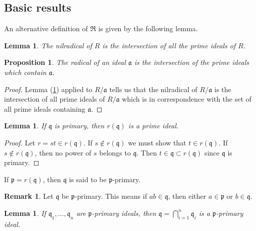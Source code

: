 \documentclass[	DIV=calc,paper=a4,fontsize=11pt]{scrartcl}	 					%
\newtheorem{lem}[thm]{Lemma}
\newtheorem{prop}[thm]{Proposition}
\theoremstyle{definition}
\newtheorem{rem}[thm]{Remark}
\theoremstyle{plain}
\theoremstyle{remark}
\begin{document}
\subsection{Basic results}

An alternative definition of $\mathfrak{R}$ is given by the following lemma.
\begin{lem}\label{nil}
The nilradical of $R$ is the intersection of all the prime ideals of $R$.
\end{lem}

\begin{prop}
The radical of an ideal $\mathfrak{a}$ is the intersection of the prime ideals which contain $\mathfrak{a}$.
\end{prop}
\begin{proof}
Lemma (\ref{nil}) applied to $R/\mathfrak{a}$ tells us that the nilradical of $R/\mathfrak{a}$ is the intersection of all prime ideals of $R/\mathfrak{a}$ which is in correspondence with the set of all prime ideals containing $\mathfrak{a}$.
\end{proof}
\begin{lem}
If $\mathfrak{q}$ is primary, then $r(\mathfrak{q})$ is a prime ideal.
\end{lem}
\begin{proof}
Let $r=st\in r(\mathfrak{q})$. If $s\notin r(\mathfrak{q})$ we must show that $t\in r(\mathfrak{q})$. If $s\notin r(\mathfrak{q})$, then no power of $s$ belongs to $\mathfrak{q}$. Then $t\in \mathfrak{q}\subset r(\mathfrak{q})$ since $\mathfrak{q}$ is primary.
\end{proof}
If $\mathfrak{p}= r(\mathfrak{q})$, then $\mathfrak{q}$ is said to be $\mathfrak{p}$-primary.

\begin{rem}
Let $\mathfrak{q}$ be $\mathfrak{p}$-primary. This means if $ab\in\mathfrak{q}$, then either $a\in \mathfrak{p}$ or $b\in \mathfrak{q}$.
\end{rem}

\begin{lem}\label{minimal}
If $\mathfrak{q}_1,\ldots,\mathfrak{q}_n$ are $\mathfrak{p}$-primary ideals, then $\mathfrak{q}=\bigcap_{i=1}^n \mathfrak{q}_i$ is a $\mathfrak{p}$-primary ideal.
\end{lem}
\end{document}
